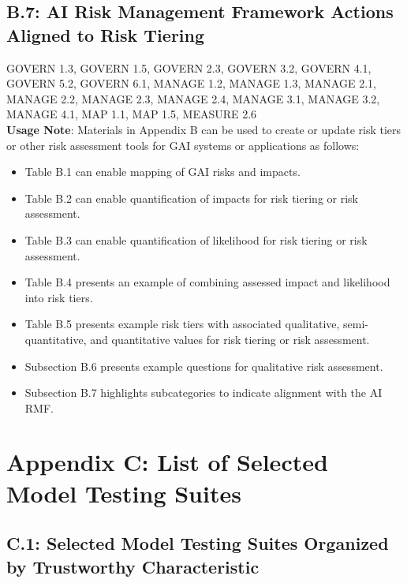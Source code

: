 \documentclass[fleqn]{article}
\begin{document}
\subsection*{B.7: AI Risk Management Framework Actions Aligned to Risk Tiering}\label{appndxb7}

GOVERN 1.3, GOVERN 1.5, GOVERN 2.3, GOVERN 3.2, GOVERN 4.1, GOVERN 5.2, GOVERN 6.1, MANAGE 1.2, MANAGE 1.3, MANAGE 2.1, MANAGE 2.2, MANAGE 2.3, 
MANAGE 2.4, MANAGE 3.1, MANAGE 3.2, MANAGE 4.1, MAP 1.1, MAP 1.5, MEASURE 2.6 \\

\noindent \textbf{Usage Note}: Materials in Appendix B can be used to create or update risk tiers or other risk assessment tools for GAI systems or applications as follows:
\begin{itemize}
	\item Table B.1 can enable mapping of GAI risks and impacts. 
	\item Table B.2 can enable quantification of impacts for risk tiering or risk assessment. 
	\item Table B.3 can enable quantification of likelihood for risk tiering or risk assessment.
	\item Table B.4 presents an example of combining assessed impact and likelihood into risk tiers. 
	\item Table B.5 presents example risk tiers with associated qualitative, semi-quantitative, and quantitative values for risk tiering  or risk assessment.
	\item Subsection B.6 presents example questions for qualitative risk assessment.
	\item Subsection B.7 highlights subcategories to indicate alignment with the AI RMF.   
\end{itemize} 

\pagebreak

\section*{Appendix C: List of Selected Model Testing Suites}\label{sec:appndxc}

\subsection*{C.1: Selected Model Testing Suites Organized by Trustworthy Characteristic}\label{appndxc1}
\end{document}
